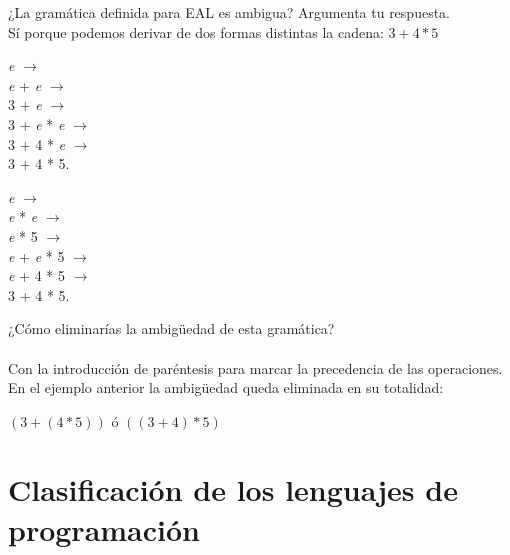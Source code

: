     \begin{exercise}
        ¿La gramática definida para \textsf{EAL} es ambigua? Argumenta tu respuesta.                          \\
             Sí porque podemos derivar de dos formas distintas la cadena: $3 + 4 * 5$                            
             \begin{center}
                 \textit{e} $\rightarrow$ \\
                 \textit{e} + \textit{e} $\rightarrow$ \\
                 3 + \textit{e} $\rightarrow$ \\
                 3 + \textit{e} * \textit{e} $\rightarrow$ \\
                 3 + 4 * \textit{e} $\rightarrow$ \\
                 3 + 4 * 5.  \\
                 
                 \bigskip
                 
                 \textit{e} $\rightarrow$ \\
                 \textit{e} * \textit{e} $\rightarrow$ \\
                 \textit{e} * 5 $\rightarrow$ \\
                 \textit{e} + \textit{e} * 5 $\rightarrow$ \\
                 \textit{e} + 4 * 5 $\rightarrow$ \\
                 3 + 4 * 5.
             \end{center}
    \end{exercise}

    \bigskip

    \begin{exercise}
        ¿Cómo eliminarías la ambigüedad de esta gramática?    \\\\                    
            Con la introducción de paréntesis para marcar la precedencia de las operaciones. 
            En el ejemplo anterior la ambigüedad queda eliminada en su totalidad:
            \begin{center}
                $(3 + (4 * 5))$  ó $((3 + 4 )* 5)$
            \end{center}
    \end{exercise}


\section{Clasificación de los lenguajes de programación}


